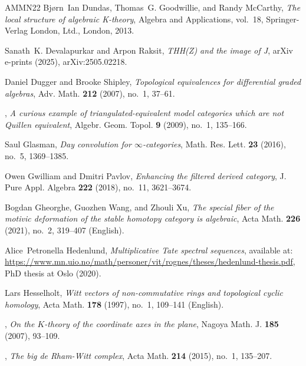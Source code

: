 \documentclass[english,10pt]{amsart}
\theoremstyle{definition}
\numberwithin{equation}{section}
\begin{document}
{\begin{thebibliography}{AMMN22}
Bj\o rn~Ian Dundas, Thomas~G. Goodwillie, and Randy McCarthy, \emph{The local structure of algebraic {K}-theory}, Algebra and Applications, vol.~18, Springer-Verlag London, Ltd., London, 2013. 

Sanath~K. {Devalapurkar} and Arpon {Raksit}, \emph{{THH(Z) and the image of J}}, arXiv e-prints (2025), arXiv:2505.02218.

Daniel Dugger and Brooke Shipley, \emph{Topological equivalences for differential graded algebras}, Adv. Math. \textbf{212} (2007), no.~1, 37--61. 

\bysame, \emph{A curious example of triangulated-equivalent model categories which are not {Q}uillen equivalent}, Algebr. Geom. Topol. \textbf{9} (2009), no.~1, 135--166. 

Saul Glasman, \emph{Day convolution for {$\infty$}-categories}, Math. Res. Lett. \textbf{23} (2016), no.~5, 1369--1385. 

Owen Gwilliam and Dmitri Pavlov, \emph{Enhancing the filtered derived category}, J. Pure Appl. Algebra \textbf{222} (2018), no.~11, 3621--3674. 

Bogdan Gheorghe, Guozhen Wang, and Zhouli Xu, \emph{The special fiber of the motivic deformation of the stable homotopy category is algebraic}, Acta Math. \textbf{226} (2021), no.~2, 319--407 (English).

Alice~Petronella Hedenlund, \emph{Multiplicative {T}ate spectral sequences}, available at: \href{https://www.mn.uio.no/math/personer/vit/rognes/theses/hedenlund-thesis.pdf}{https://www.mn.uio.no/math/personer/vit/rognes/theses/hedenlund-thesis.pdf}, PhD thesis at Oslo (2020).

Lars Hesselholt, \emph{Witt vectors of non-commutative rings and topological cyclic homology}, Acta Math. \textbf{178} (1997), no.~1, 109--141 (English).

\bysame, \emph{On the {$K$}-theory of the coordinate axes in the plane}, Nagoya Math. J. \textbf{185} (2007), 93--109. 

\bysame, \emph{The big de {R}ham-{W}itt complex}, Acta Math. \textbf{214} (2015), no.~1, 135--207. 


\end{thebibliography}}
\end{document}
